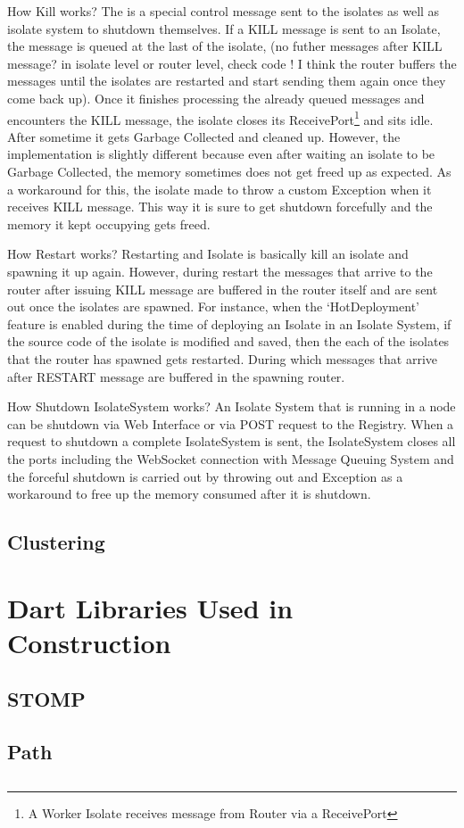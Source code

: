 \begin{description}
    \item How Kill works?
    The is a special control message sent to the isolates as well as isolate system to shutdown themselves. If a KILL message is sent to an Isolate, the message is queued at the last of the isolate, (no futher messages after KILL message? in isolate level or router level, check code ! I think the router buffers the messages until the isolates are restarted and start sending them again once they come back up). Once it finishes processing the already queued messages and encounters the KILL message, the isolate closes its ReceivePort\footnote{A Worker Isolate receives message from Router via a ReceivePort} and sits idle. After sometime it gets Garbage Collected and cleaned up. However, the implementation is slightly different because even after waiting an isolate to be Garbage Collected, the memory sometimes does not get freed up as expected. As a workaround for this, the isolate made to throw a custom Exception when it receives KILL message. This way it is sure to get shutdown forcefully and the memory it kept occupying gets freed.

    \item How Restart works?
    Restarting and Isolate is basically kill an isolate and spawning it up again. However, during restart the messages that arrive to the router after issuing KILL message are buffered in the router itself and are sent out once the isolates are spawned. For instance, when the ‘HotDeployment’ feature is enabled during the time of deploying an Isolate in an Isolate System, if the source code of the isolate is modified and saved, then the each of the isolates that the router has spawned gets restarted. During which messages that arrive after RESTART message are buffered in the spawning router.

    \item How Shutdown IsolateSystem works?
    An Isolate System that is running in a node can be shutdown via Web Interface or via POST request to the Registry. When a request to shutdown a complete IsolateSystem is sent, the IsolateSystem closes all the ports including the WebSocket connection with Message Queuing System and the forceful shutdown is carried out by throwing out and Exception as a workaround to free up the memory consumed after it is shutdown.

  \end{description}
\subsection{Clustering}


\section{Dart Libraries Used in Construction}
  \subsection{STOMP}
  \subsection{Path}
  \subsection{}
